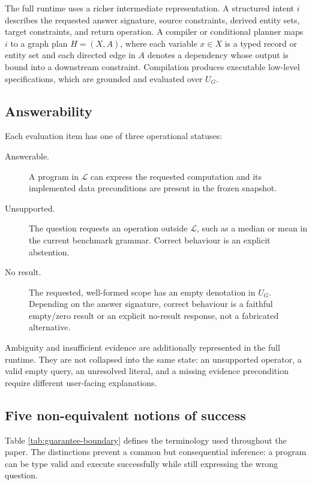 The full runtime uses a richer intermediate representation.  A structured intent $i$ describes
the requested answer signature, source constraints, derived entity sets, target constraints, and
return operation.  A compiler or conditional planner maps $i$ to a graph plan
$H=(X,A)$, where each variable $x\in X$ is a typed record or entity set and each directed edge
in $A$ denotes a dependency whose output is bound into a downstream constraint.  Compilation
produces executable low-level specifications, which are grounded and evaluated over $U_G$.

\subsection{Answerability}

Each evaluation item has one of three operational statuses:
\begin{description}
  \item[Answerable.] A program in $\mathcal{L}$ can express the requested computation and its
  implemented data preconditions are present in the frozen snapshot.
  \item[Unsupported.] The question requests an operation outside $\mathcal{L}$, such as a median
  or mean in the current benchmark grammar.  Correct behaviour is an explicit abstention.
  \item[No result.] The requested, well-formed scope has an empty denotation in $U_G$.  Depending
  on the answer signature, correct behaviour is a faithful empty/zero result or an explicit
  no-result response, not a fabricated alternative.
\end{description}
Ambiguity and insufficient evidence are additionally represented in the full runtime.  They are
not collapsed into the same state: an unsupported operator, a valid empty query, an unresolved
literal, and a missing evidence precondition require different user-facing explanations.

\subsection{Five non-equivalent notions of success}

Table \ref{tab:guarantee-boundary} defines the terminology used throughout the paper.  The
distinctions prevent a common but consequential inference: a program can be type valid and
execute successfully while still expressing the wrong question.

